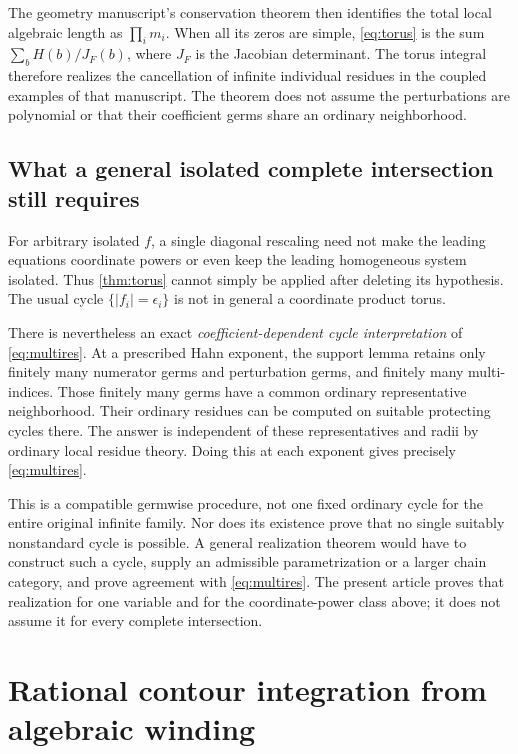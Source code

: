 \documentclass[11pt,letterpaper]{article}
\theoremstyle{definition}
\theoremstyle{remark}
\numberwithin{equation}{section}
\begin{document}
The geometry manuscript's conservation theorem then identifies the total local algebraic length as $\prod_i m_i$. When all its zeros are simple, \eqref{eq:torus} is the sum $\sum_b H(b)/J_F(b)$, where $J_F$ is the Jacobian determinant. The torus integral therefore realizes the cancellation of infinite individual residues in the coupled examples of that manuscript. The theorem does not assume the perturbations are polynomial or that their coefficient germs share an ordinary neighborhood.

\subsection{What a general isolated complete intersection still requires}
For arbitrary isolated $f$, a single diagonal rescaling need not make the leading equations coordinate powers or even keep the leading homogeneous system isolated. Thus \cref{thm:torus} cannot simply be applied after deleting its hypothesis. The usual cycle $\{|f_i|=\epsilon_i\}$ is not in general a coordinate product torus.

There is nevertheless an exact \emph{coefficient-dependent cycle interpretation} of \eqref{eq:multires}. At a prescribed Hahn exponent, the support lemma retains only finitely many numerator germs and perturbation germs, and finitely many multi-indices. Those finitely many germs have a common ordinary representative neighborhood. Their ordinary residues can be computed on suitable protecting cycles there. The answer is independent of these representatives and radii by ordinary local residue theory. Doing this at each exponent gives precisely \eqref{eq:multires}.

This is a compatible germwise procedure, not one fixed ordinary cycle for the entire original infinite family. Nor does its existence prove that no single suitably nonstandard cycle is possible. A general realization theorem would have to construct such a cycle, supply an admissible parametrization or a larger chain category, and prove agreement with \eqref{eq:multires}. The present article proves that realization for one variable and for the coordinate-power class above; it does not assume it for every complete intersection.

\section{Rational contour integration from algebraic winding}\label{sec:algebraic-residue}
\end{document}
